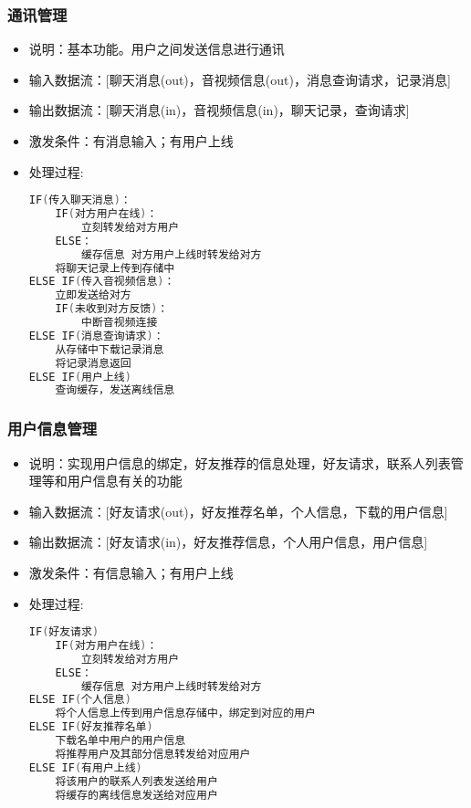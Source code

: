             \subsubsection{通讯管理}
            \begin{itemize}
                \item 说明：基本功能。用户之间发送信息进行通讯
                \item 输入数据流：[聊天消息(out)，音视频信息(out)，消息查询请求，记录消息]
                \item 输出数据流：[聊天消息(in)，音视频信息(in)，聊天记录，查询请求]
                \item 激发条件：有消息输入；有用户上线
                \item 处理过程: 
\begin{lstlisting}[language=C, caption=通讯管理, label={code:first-code}]
IF(传入聊天消息)：
    IF(对方用户在线)：
        立刻转发给对方用户
    ELSE：
        缓存信息 对方用户上线时转发给对方
    将聊天记录上传到存储中
ELSE IF(传入音视频信息)：
    立即发送给对方
    IF(未收到对方反馈)：
        中断音视频连接
ELSE IF(消息查询请求)：
    从存储中下载记录消息
    将记录消息返回
ELSE IF(用户上线)
    查询缓存，发送离线信息
\end{lstlisting}
            \end{itemize}
            \subsubsection{用户信息管理}
            \begin{itemize}
                \item 说明：实现用户信息的绑定，好友推荐的信息处理，好友请求，联系人列表管理等和用户信息有关的功能
                \item 输入数据流：[好友请求(out)，好友推荐名单，个人信息，下载的用户信息]
                \item 输出数据流：[好友请求(in)，好友推荐信息，个人用户信息，用户信息]
                \item 激发条件：有信息输入；有用户上线
                \item 处理过程: 
\begin{lstlisting}[language=C, caption=用户信息管理, label={code:first-code}]
IF(好友请求)
    IF(对方用户在线)：
        立刻转发给对方用户
    ELSE：
        缓存信息 对方用户上线时转发给对方
ELSE IF(个人信息)
    将个人信息上传到用户信息存储中，绑定到对应的用户
ELSE IF(好友推荐名单)
    下载名单中用户的用户信息
    将推荐用户及其部分信息转发给对应用户
ELSE IF(有用户上线)
    将该用户的联系人列表发送给用户
    将缓存的离线信息发送给对应用户
\end{lstlisting}
             \end{itemize}
